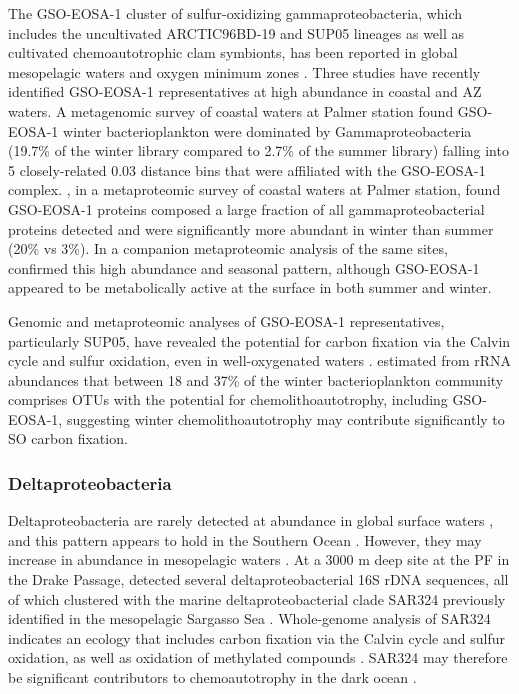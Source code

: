 
The GSO-EOSA-1 cluster of sulfur-oxidizing gammaproteobacteria, which includes the uncultivated ARCTIC96BD-19 and SUP05 lineages as well as cultivated chemoautotrophic clam symbionts, has been reported in global mesopelagic waters \cite{Swan:2011hb} and oxygen minimum zones \cite{Walsh:2009fja,Canfield:2010ib}.
Three studies have recently identified GSO-EOSA-1 representatives at high abundance in coastal and \ac{AZ} waters.
A metagenomic survey of coastal waters at Palmer station found GSO-EOSA-1 winter bacterioplankton were dominated by Gammaproteobacteria (19.7\% of the winter library compared to 2.7\% of the summer library) falling into 5 closely-related 0.03 distance bins that were affiliated with the GSO-EOSA-1 complex.
\cite{Grzymski:2012ej}, in a metaproteomic survey of coastal waters at Palmer station, found GSO-EOSA-1 proteins composed a large fraction of all gammaproteobacterial proteins detected and were significantly more abundant in winter than summer (20\% vs 3\%).
In a companion metaproteomic analysis of the same sites, \cite{Williams:2012bs} confirmed this high abundance and seasonal pattern, although GSO-EOSA-1 appeared to be metabolically active at the surface in both summer and winter.

Genomic and metaproteomic analyses of GSO-EOSA-1 representatives, particularly SUP05, have revealed the potential for carbon fixation via the Calvin cycle and sulfur oxidation, even in well-oxygenated waters \cite{Walsh:2009fja,Swan:2011hb,Grzymski:2012ej}.
\cite{Grzymski:2012ej} estimated from rRNA abundances that between 18 and 37\% of the winter bacterioplankton community comprises \acp{OTU} with the potential for chemolithoautotrophy, including GSO-EOSA-1, suggesting winter chemolithoautotrophy may contribute significantly to \ac{SO} carbon fixation.

\subsubsection{Deltaproteobacteria}

Deltaproteobacteria are rarely detected at abundance in global surface waters \citep[see e.g.][]{Venter:2004hg}, and this pattern appears to hold in the Southern Ocean \cite{Murray:2007db,West:2008kc,Ghiglione:2011ee,Murray:2011ib,Ducklow:2011jl,Jamieson:2012up}.
However, they may increase in abundance in mesopelagic waters \cite{Wright:1997vg,Pham:2008bba,Zaballos:2006hr}.
At a 3000 m deep site at the \ac{PF} in the Drake Passage, \citet{LopezGarcia:2001vp} detected several deltaproteobacterial 16S rDNA sequences, all of which clustered with the marine deltaproteobacterial clade SAR324 previously identified in the mesopelagic Sargasso Sea \cite{Wright:1997vg}.
Whole-genome analysis of SAR324 indicates an ecology that includes carbon fixation via the Calvin cycle and sulfur oxidation, as well as oxidation of methylated compounds \cite{Swan:2011hb}.
SAR324 may therefore be significant contributors to chemoautotrophy in the dark ocean \cite{Swan:2011hb}.

